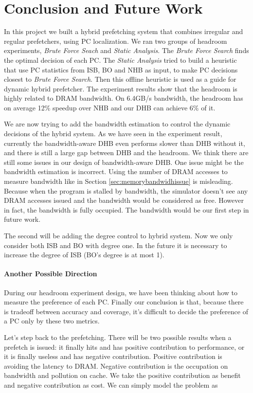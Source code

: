 \section{Conclusion and Future Work}
\label{sec:conclusion}

In this project we built a hybrid prefetching system that combines irregular and regular prefetchers, using PC localization. 
We ran two groups of headroom experiments, \emph{Brute Force Seach} and \emph{Static Analysis}. The \emph{Brute Force Search} finds the optimal decision of each PC.  
The \emph{Static Analysis} tried to build a heuristic that use PC statistics from ISB, BO and NHB as input, to make PC decisions closest to \emph{Brute Force Search}. 
Then this offline heuristic is used as a guide for dynamic hybrid prefetcher. 
The experiment results show that the headroom is highly related to DRAM bandwidth. On 6.4GB/s bandwidth, the headroom has on average 12\% speedup over NHB and our DHB can achieve 6\% of it. \par

We are now trying to add the bandwidth estimation to control the dynamic decisions of the hybrid system. 
As we have seen in the experiment result, currently the bandwidth-aware DHB even performs slower than DHB without it, and there is still a large gap between DHB and the headroom. 
We think there are still some issues in our design of bandwidth-aware DHB. One issue might be the bandwidth estimation is incorrect. Using the number of DRAM accesses to measure bandwidth like in Section \ref{sec:memorybandwidhissue} is misleading. Because when the program is stalled by bandwidth, the simulator doesn't see any DRAM accesses issued and the bandwidth would be considered as free. However in fact, the bandwidth is fully occupied. The bandwidth would be our first step in future work. \par

The second will be adding the degree control to hybrid system. Now we only consider both ISB and BO with degree one. In the future it is necessary to increase the degree of ISB (BO's degree is at most 1).\par

\paragraph{Another Possible Direction}
During our headroom experiment design, we have been thinking about how to measure the preference of each PC. Finally our conclusion is that, because there is tradeoff between accuracy and coverage, it's difficult to decide the preference of a PC only by these two metrics. \par
Let's step back to the prefetching. There will be two possible results when a prefetch is issued: it finally hits and has positive contribution to performance, or it is finally useless and has negative contribution. Positive contribution is avoiding the latency to DRAM. Negative contribution is the occupation on bandwidth and pollution on cache. We take the positive contribution as benefit and negative contribution as cost. We can simply model the problem as\par

